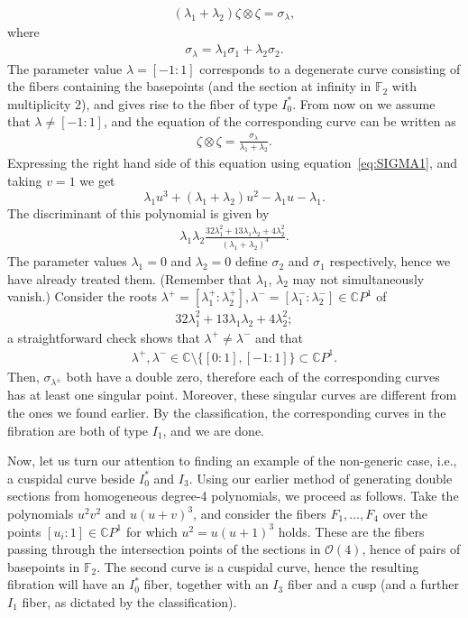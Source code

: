 \documentclass[pdftex]{sigma}
\newcommand{\C}{{\mathbb C}} %
\newcommand{\CP}[1]{\mathbb{C}P^{#1}} %
\numberwithin{equation}{section}
\begin{document}
\begin{Example}
\begin{gather*}
 (\lambda_1 + \lambda_2) \zeta \otimes \zeta = \sigma_{\lambda},
\end{gather*}
where
\begin{gather*}
 \sigma_{\lambda} = \lambda_1 \sigma_1 + \lambda_2 \sigma_2.
\end{gather*}
The parameter value $\lambda = [-1:1]$ corresponds to a degenerate
 curve consisting of the fibers containing the basepoints (and the
 section at infinity in ${\mathbb {F}}_2$ with multiplicity $2$), and
 gives rise to the fiber of type $I_0^*$. From now on we assume that
 $\lambda \neq [-1:1]$, and the equation of the corresponding curve
 can be written as
\begin{gather*}
 \zeta \otimes \zeta = \frac{\sigma_{\lambda}}{\lambda_1 + \lambda_2}.
\end{gather*}
Expressing the right hand side of this equation using equation~\eqref{eq:SIGMA1},
and taking $v=1$ we get
\[
\lambda _1u^3+(\lambda _1+\lambda _2)u^2-\lambda _1u-\lambda _1.
\]
The discriminant of this polynomial is given by
\begin{gather*}
 \lambda_1 \lambda_2 \frac{32 \lambda_1^2 + 13 \lambda_1 \lambda_2 + 4 \lambda_2^2}{(\lambda_1 + \lambda_2)^4}.
\end{gather*}
The parameter values $\lambda_1 = 0$ and $\lambda_2 = 0$ define $\sigma_2$ and $\sigma_1$ respectively,
hence we have already treated them. (Remember that $\lambda_1$, $\lambda_2$ may not simultaneously vanish.)
Consider the roots $\lambda^+=[\lambda _1^+:\lambda _2^+], \lambda^- =[\lambda _1^-:\lambda _2^-] \in\CP1$ of
\begin{gather*}
 32 \lambda_1^2 + 13 \lambda_1 \lambda_2 + 4 \lambda_2^2;
\end{gather*}
a straightforward check shows that $\lambda^+ \neq \lambda^-$ and that
\begin{gather*}
 \lambda^+, \lambda^- \in\C\setminus \{ [0:1] , [-1:1] \}\subset\CP1.
\end{gather*} Then, $\sigma_{\lambda^{\pm}}$ both have a double zero, therefore
 each of the corresponding curves has at least one singular
 point. Moreover, these singular curves are different from the ones
 we found earlier. By the classification, the corresponding curves in
 the fibration are both of type $I_1$, and we are done.

Now, let us turn our attention to finding an example of the non-generic case,
i.e., a cuspidal curve beside $I_0^*$ and $I_3$.
Using our earlier method of generating double sections
from homogeneous degree-4 polynomials, we proceed as follows. Take the
polynomials $u^2v^2$ and $u(u+v)^3$, and consider the fibers $F_1,
\ldots , F_4$ over the points $[u_i:1]\in \CP{1}$ for which
$u^2=u(u+1)^3$ holds. These are the fibers passing through the
intersection points of the sections in ${\mathcal {O}}(4)$, hence of
pairs of basepoints in ${\mathbb {F}}_2$. The second curve is a
cuspidal curve, hence the resulting fibration will have an
$I_0^*$ fiber, together with an $I_3$ fiber and a cusp (and a further
$I_1$ fiber, as dictated by the classification).
\end{Example}
\end{document}
